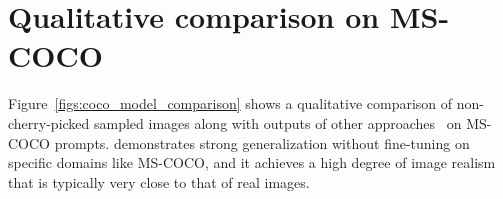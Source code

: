 \section{Qualitative comparison on MS-COCO}
\label{secs:appendix_qualitative_comparison}
Figure~\ref{figs:coco_model_comparison} shows a qualitative comparison of non-cherry-picked \bdraw sampled images along with outputs of other approaches~\cite{ramesh2021zero, nichol2021glide, gafni2022make, ramesh2022hierarchical} on MS-COCO prompts. \bdraw demonstrates strong generalization without fine-tuning on specific domains like MS-COCO, and it achieves a high degree of image realism that is typically very close to that of real images.

 